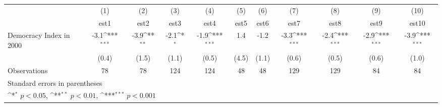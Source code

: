 {
\def\sym#1{\ifmmode^{#1}\else\(^{#1}\)\fi}
\begin{tabular}{l*{10}{c}}
\hline\hline
                    &\multicolumn{1}{c}{(1)}         &\multicolumn{1}{c}{(2)}         &\multicolumn{1}{c}{(3)}         &\multicolumn{1}{c}{(4)}         &\multicolumn{1}{c}{(5)}         &\multicolumn{1}{c}{(6)}         &\multicolumn{1}{c}{(7)}         &\multicolumn{1}{c}{(8)}         &\multicolumn{1}{c}{(9)}         &\multicolumn{1}{c}{(10)}         \\
                    &        est1         &        est2         &        est3         &        est4         &        est5         &        est6         &        est7         &        est8         &        est9         &       est10         \\
\hline
Democracy Index in 2000&        -3.1\sym{***}&        -3.9\sym{**} &        -2.1\sym{*}  &        -1.9\sym{***}&         1.4         &        -1.2         &        -3.3\sym{***}&        -2.4\sym{***}&        -2.9\sym{***}&        -3.9\sym{***}\\
                    &       (0.4)         &       (1.5)         &       (1.1)         &       (0.5)         &       (4.5)         &       (1.1)         &       (0.6)         &       (0.5)         &       (0.6)         &       (1.0)         \\
\hline
Observations        &          78         &          78         &         124         &         124         &          48         &          48         &         129         &         129         &          84         &          84         \\
\hline\hline
\multicolumn{11}{l}{\footnotesize Standard errors in parentheses}\\
\multicolumn{11}{l}{\footnotesize \sym{*} \(p<0.05\), \sym{**} \(p<0.01\), \sym{***} \(p<0.001\)}\\
\end{tabular}
}
